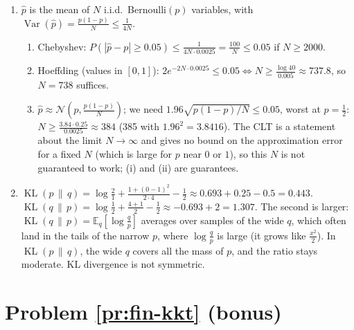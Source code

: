 \documentclass[11pt]{article}
\newcommand{\E}{\mathbb{E}}
\DeclareMathOperator{\Var}{Var}
\DeclareMathOperator{\KL}{KL}
\begin{document}
\begin{enumerate}[label=(\alph*)]
    \item $\hat p$ is the mean of $N$ i.i.d.\ Bernoulli$(p)$ variables, with $\Var(\hat p) = \frac{p(1 - p)}{N} \leq \frac{1}{4N}$.
    \begin{enumerate}[label=(\roman*)]
        \item Chebyshev: $P(|\hat p - p| \geq 0.05) \leq \frac{1}{4N \cdot 0.0025} = \frac{100}{N} \leq 0.05$ if $N \geq 2000$.
        \item Hoeffding (values in $[0, 1]$): $2e^{-2N \cdot 0.0025} \leq 0.05 \iff N \geq \frac{\log 40}{0.005} \approx 737.8$, so $N = 738$ suffices.
        \item $\hat p \approx \mathcal{N}(p, \frac{p(1 - p)}{N})$; we need $1.96\sqrt{p(1 - p)/N} \leq 0.05$, worst at $p = \frac{1}{2}$: $N \geq \frac{3.84 \cdot 0.25}{0.0025} \approx 384$ (385 with $1.96^2 = 3.8416$). The CLT is a statement about the limit $N \to \infty$ and gives no bound on the approximation error for a fixed $N$ (which is large for $p$ near $0$ or $1$), so this $N$ is not guaranteed to work; (i) and (ii) are guarantees.
    \end{enumerate}
    \item $\KL(p \,\|\, q) = \log\frac{2}{1} + \frac{1 + (0 - 1)^2}{2 \cdot 4} - \frac{1}{2} \approx 0.693 + 0.25 - 0.5 = 0.443$. $\KL(q \,\|\, p) = \log\frac{1}{2} + \frac{4 + 1}{2} - \frac{1}{2} \approx -0.693 + 2 = 1.307$. The second is larger: $\KL(q \,\|\, p) = \E_q[\log\frac{q}{p}]$ averages over samples of the wide $q$, which often land in the tails of the narrow $p$, where $\log\frac{q}{p}$ is large (it grows like $\frac{x^2}{2}$). In $\KL(p \,\|\, q)$, the wide $q$ covers all the mass of $p$, and the ratio stays moderate. KL divergence is not symmetric.
\end{enumerate}

\section*{Problem \ref{pr:fin-kkt} (bonus)}
\end{document}
